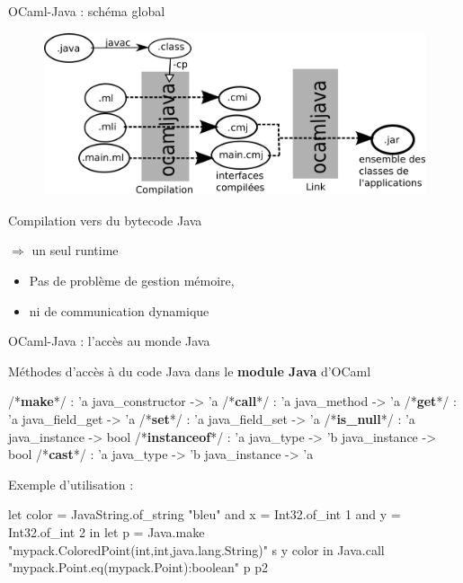 \documentclass[xcolor={table,dvipsnames}]{beamer}
\begin{document}
\begin{frame}{OCaml-Java : schéma global}
\begin{figure}[h!]
  \centering
  \includegraphics[scale=0.8]{schemaOCamlJava.png}
\end{figure}
Compilation vers du bytecode Java

$\Rightarrow$ un seul runtime
\begin{itemize}
\item Pas de problème de gestion mémoire, 
\item ni de communication dynamique
\end{itemize}
\end{frame}





\begin{frame}[fragile]{OCaml-Java : l'accès au monde Java}

Méthodes d'accès à du code Java dans le \textbf{module Java} d'OCaml
\begin{OCamlEx}
/*\textbf{make}*/ : 'a java_constructor -> 'a 
/*\textbf{call}*/ : 'a java_method -> 'a 
/*\textbf{get}*/ : 'a java_field_get -> 'a 
/*\textbf{set}*/ : 'a java_field_set -> 'a 
/*\textbf{is\_null}*/ : 'a java_instance -> bool 
/*\textbf{instanceof}*/ : 'a java_type -> 'b java_instance -> bool
/*\textbf{cast}*/ : 'a java_type -> 'b java_instance -> 'a
\end{OCamlEx}

Exemple d'utilisation :

\begin{OCamlEx}
let color = JavaString.of_string "bleu"
and x = Int32.of_int 1
and y = Int32.of_int 2 in
let p = Java.make "mypack.ColoredPoint(int,int,java.lang.String)" s y color 
in
   Java.call "mypack.Point.eq(mypack.Point):boolean" p p2
\end{OCamlEx}

\end{frame}
\end{document}
